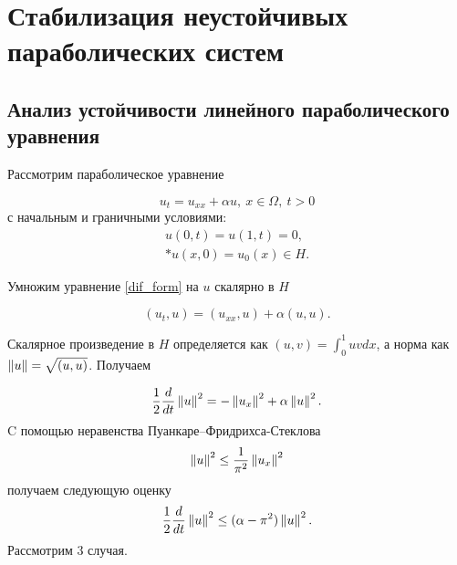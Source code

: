 \section{Стабилизация неустойчивых параболических систем}
\vspace{1em}

\subsection{Анализ устойчивости линейного параболического уравнения}

Рассмотрим параболическое уравнение

\begin{equation}\label{dif_form}
    u_t = u_{xx} + \alpha u, \ x \in \Omega, \ t > 0
\end{equation}
с начальным и граничными условиями:
\begin{gather}\label{d_control}
    u(0, t) = u(1, t) = 0, \\*
    u(x, 0) = u_{0}(x) \in H. \nonumber
\end{gather}

Умножим уравнение \eqref{dif_form} на $u$ скалярно в $H$

\begin{equation*}
    (u_t, u) = (u_{xx}, u) + \alpha (u, u).
\end{equation*}

Скалярное произведение в $H$ определяется как $(u, v) = \int_0^1 uv dx$,
а норма как $\left\lVert u\right\rVert = \sqrt{(u, u)}$. Получаем

\begin{equation}\label{int_form}
    \frac{1}{2}\frac{d}{dt}\left\lVert u\right\rVert^2 = -\left\lVert u_x\right\rVert^2 + \alpha \left\lVert u\right\rVert^2.
\end{equation}
C помощью неравенства Пуанкаре–Фридрихса-Стеклова
\begin{equation*}
    \left\lVert u\right\rVert^2 \le \frac{1}{\pi^2} \left\lVert u_x\right\rVert^2
\end{equation*}
получаем следующую оценку 
\begin{equation}\label{stable_opr}
    \frac{1}{2}\frac{d}{dt}\left\lVert u\right\rVert^2 \le (\alpha - \pi^2)\left\lVert u\right\rVert^2.
\end{equation}
Рассмотрим 3 случая.

